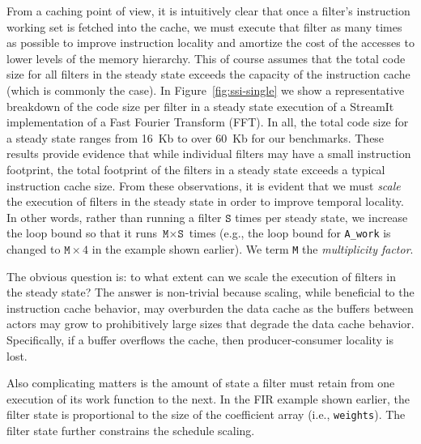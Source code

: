 From a caching point of view, it is intuitively clear that once a
filter's instruction working set is fetched into the cache, we must
execute that filter as many times as possible to improve instruction
locality and amortize the cost of the accesses to lower levels of the
memory hierarchy. This of course assumes that the total code size for
all filters in the steady state exceeds the capacity of the
instruction cache (which is commonly the case). In
Figure~\ref{fig:ssi-single} we show a representative breakdown of the
code size per filter in a steady state execution of a StreamIt
implementation of a Fast Fourier Transform (FFT). In all, the total code size for a steady state
ranges from 16~Kb to over 60~Kb for our benchmarks. These results
provide evidence that while individual filters may have a
small instruction footprint, the total footprint of the filters in a
steady state exceeds a typical instruction cache size.
From these observations, it is evident that we must {\it scale} the
execution of filters in the steady state in order to improve temporal
locality. In other words, rather than running a filter $\texttt{S}$ times per
steady state, we increase the loop bound so that it runs $\texttt{M}
\times \texttt{S}$ times (e.g., the loop bound for \verb+A_work+ is
changed to $\texttt{M} \times 4$ in the example shown earlier). 
We term \texttt{M} the {\it multiplicity factor}.

The obvious question is: to what extent can we scale the execution of
filters in the steady state? The answer is non-trivial because
scaling, while beneficial to the instruction cache behavior, may
overburden the data cache as the buffers between actors may grow to
prohibitively large sizes that degrade the data cache
behavior. Specifically, if a buffer overflows the cache, then
producer-consumer locality is lost. 

Also complicating matters is the amount of state a filter must retain
from one execution of its work function to the next. In the FIR
example shown earlier, the filter state is proportional to the size of
the coefficient array (i.e., \texttt{weights}). The filter state
further constrains the schedule scaling.
